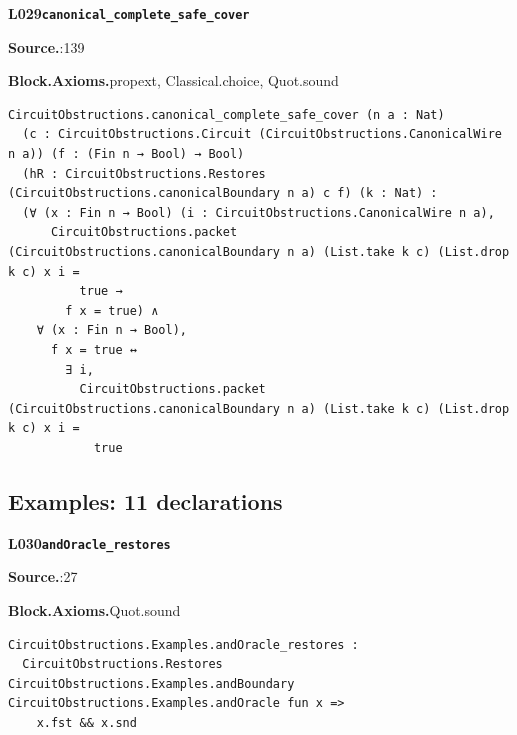 \par\medskip\noindent\begin{minipage}{\textwidth}
{\small\bfseries L029\enspace\texttt{canonical\_complete\_safe\_cover}\par}
{\footnotesize\raggedright\textbf{Source.}\enspace{}:139\par
\textbf{Block.}\quad\textbf{Axioms.}\enspace propext, Classical.choice, Quot.sound\par}\nopagebreak
\begin{lstlisting}
CircuitObstructions.canonical_complete_safe_cover (n a : Nat)
  (c : CircuitObstructions.Circuit (CircuitObstructions.CanonicalWire n a)) (f : (Fin n → Bool) → Bool)
  (hR : CircuitObstructions.Restores (CircuitObstructions.canonicalBoundary n a) c f) (k : Nat) :
  (∀ (x : Fin n → Bool) (i : CircuitObstructions.CanonicalWire n a),
      CircuitObstructions.packet (CircuitObstructions.canonicalBoundary n a) (List.take k c) (List.drop k c) x i =
          true →
        f x = true) ∧
    ∀ (x : Fin n → Bool),
      f x = true ↔
        ∃ i,
          CircuitObstructions.packet (CircuitObstructions.canonicalBoundary n a) (List.take k c) (List.drop k c) x i =
            true
\end{lstlisting}
\end{minipage}\par

\subsection*{Examples: 11 declarations}
\par\medskip\noindent\begin{minipage}{\textwidth}
{\small\bfseries L030\enspace\texttt{andOracle\_restores}\par}
{\footnotesize\raggedright\textbf{Source.}\enspace{}:27\par
\textbf{Block.}\quad\textbf{Axioms.}\enspace Quot.sound\par}\nopagebreak
\begin{lstlisting}
CircuitObstructions.Examples.andOracle_restores :
  CircuitObstructions.Restores CircuitObstructions.Examples.andBoundary CircuitObstructions.Examples.andOracle fun x =>
    x.fst && x.snd
\end{lstlisting}
\end{minipage}\par

